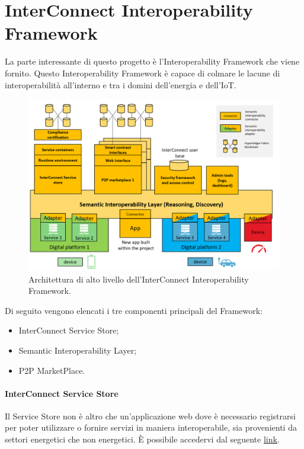 \section{InterConnect Interoperability Framework}
La parte interessante di questo progetto è l'Interoperability Framework che viene fornito.
Questo Interoperability Framework è capace di colmare le lacune di interoperabilità all'interno e tra i domini dell'energia e dell'IoT.

\begin{figure}[H]
    \centering
    \includegraphics[width=\textwidth]{figures/architetturaFrameworkInterconnect.png}
    \caption{Architettura di alto livello dell'InterConnect Interoperability Framework.}
    \label{fig:architetturaFrameworkInterconnect}
\end{figure}

Di seguito vengono elencati i tre componenti principali del Framework:
\begin{itemize}
    \item InterConnect Service Store;
    \item Semantic Interoperability Layer;
    \item P2P MarketPlace.
\end{itemize}

\paragraph{InterConnect Service Store}

Il Service Store non è altro che un'applicazione web dove è necessario registrarsi per poter utilizzare o fornire servizi in maniera interoperabile, sia provenienti da settori energetici che non energetici. È possibile accedervi dal seguente \href{https://store.interconnectproject.eu/ServiceStore}{link}.

